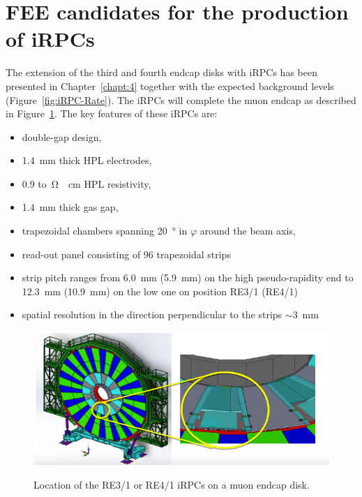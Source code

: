 \section{FEE candidates for the production of iRPCs}
\label{chapt6:sec:candidates}

	The extension of the third and fourth endcap disks with \acl{iRPC}s has been presented in Chapter~\ref{chapt:4} together with the expected background levels (Figure~\ref{fig:iRPC-Rate}). The iRPCs will complete the muon endcap as described in Figure~\ref{fig:iRPC-Wheel}. The key features of these iRPCs are:

	\begin{itemize}
		\item double-gap design,
		\item \SI{1.4}{mm} thick HPL electrodes,
		\item 0.9 to \,\si{\ohm\cdot cm} HPL resistivity,
		\item \SI{1.4}{mm} thick gas gap,
		\item trapezoidal chambers spanning \SI{20}{\degree} in $\varphi$ around the beam axis,
		\item read-out panel consisting of 96 trapezoidal strips
		\item strip pitch ranges from \SI{6.0}{mm} (\SI{5.9}{mm}) on the high pseudo-rapidity end to \SI{12.3}{mm} (\SI{10.9}{mm}) on the low one on position RE3/1 (RE4/1)
		\item spatial resolution in the direction perpendicular to the strips $\sim$\SI{3}{mm}
	\end{itemize}
	
	\begin{figure}[H]
		\centering
		\includegraphics[width = \linewidth]{fig/chapt6/iRPC-Wheel.png}\\
		\caption{\label{fig:iRPC-Wheel} Location of the RE3/1 or RE4/1 iRPCs on a muon endcap disk.}
	\end{figure}

